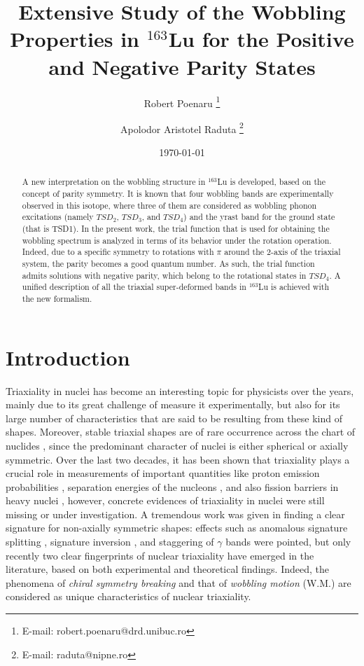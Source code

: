 \documentclass[11pt]{article}
\title{Extensive Study of the Wobbling Properties in $^{163}$Lu for the Positive and Negative Parity States}
\author[1,2]{Robert Poenaru \thanks{E-mail: robert.poenaru@drd.unibuc.ro}}
\author[2,3]{Apolodor Aristotel Raduta \thanks{E-mail: raduta@nipne.ro}}
\affil[1]{Doctoral School of Physics, University of Bucharest, Romania}
\affil[2]{\textit{Horia Hulubei} National Institute for Physics and Nuclear Engineering, M\u{a}gurele-Bucharest, Romania}
\affil[3]{Academy of Romanian Scientists, Bucharest, Romania}
\date{\today}
\begin{document}


\maketitle

\begin{abstract}
A new interpretation on the wobbling structure in $^{163}$Lu is developed, based on the concept of parity symmetry. It is known that four wobbling bands are experimentally observed in this isotope, where three of them are considered as wobbling phonon excitations (namely $TSD_2$, $TSD_3$, and $TSD_4$) and the yrast band for the ground state (that is TSD1). In the present work, the trial function that is used for obtaining the wobbling spectrum is analyzed in terms of its behavior under the rotation operation. Indeed, due to a specific symmetry to rotations with $\pi$ around the 2-axis of the triaxial system, the parity becomes a good quantum number. As such, the trial function admits solutions with negative parity, which belong to the rotational states in $TSD_4$. A unified description of all the triaxial super-deformed bands in $^{163}$Lu is achieved with the new formalism.
\end{abstract}

\section{Introduction}

Triaxiality in nuclei has become an interesting topic for physicists over the years, mainly due to its great challenge of measure it experimentally, but also for its large number of characteristics that are said to be resulting from these kind of shapes. Moreover, stable triaxial shapes are of rare occurrence across the chart of nuclides \cite{moller2006global}, since the predominant character of nuclei is either spherical or axially symmetric. Over the last two decades, it has been shown that triaxiality plays a crucial role in measurements of important quantities like proton emission probabilities \cite{delion2006theories}, separation energies of the nucleons \cite{moller2006global}, and also fission barriers in heavy nuclei  \cite{moller2009heavy}, however, concrete evidences of triaxiality in nuclei were still missing or under investigation. A tremendous work was given in finding a clear signature for non-axially symmetric shapes: effects such as anomalous signature splitting \cite{hamamoto1988triaxial}, signature inversion \cite{bengtsson1984signature}, and staggering of $\gamma$ bands \cite{stachel1982triaxiality} were pointed, but only recently two clear fingerprints of nuclear triaxiality have emerged in the literature, based on both experimental and theoretical findings. Indeed, the phenomena of \emph{chiral symmetry breaking} and that of \emph{wobbling motion} (W.M.) are considered as unique characteristics of nuclear triaxiality. 
\end{document}
